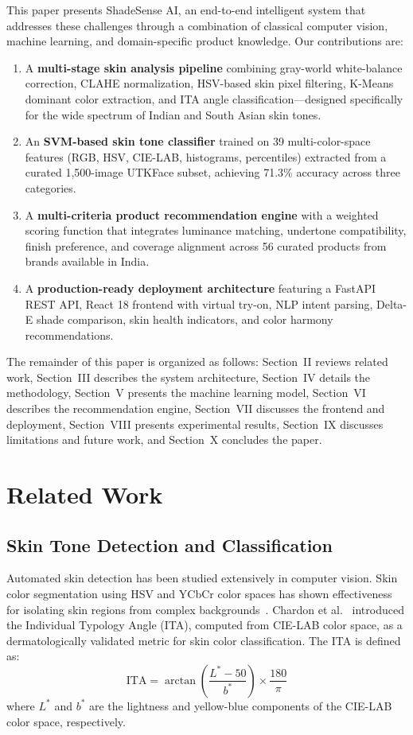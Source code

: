 \documentclass[conference]{IEEEtran}
\begin{document}
This paper presents ShadeSense AI, an end-to-end intelligent system that addresses these challenges through a combination of classical computer vision, machine learning, and domain-specific product knowledge. Our contributions are:

\begin{enumerate}
    \item A \textbf{multi-stage skin analysis pipeline} combining gray-world white-balance correction, CLAHE normalization, HSV-based skin pixel filtering, K-Means dominant color extraction, and ITA angle classification---designed specifically for the wide spectrum of Indian and South Asian skin tones.
    \item An \textbf{SVM-based skin tone classifier} trained on 39 multi-color-space features (RGB, HSV, CIE-LAB, histograms, percentiles) extracted from a curated 1,500-image UTKFace subset, achieving 71.3\% accuracy across three categories.
    \item A \textbf{multi-criteria product recommendation engine} with a weighted scoring function that integrates luminance matching, undertone compatibility, finish preference, and coverage alignment across 56 curated products from brands available in India.
    \item A \textbf{production-ready deployment architecture} featuring a FastAPI REST API, React 18 frontend with virtual try-on, NLP intent parsing, Delta-E shade comparison, skin health indicators, and color harmony recommendations.
\end{enumerate}

The remainder of this paper is organized as follows: Section~II reviews related work, Section~III describes the system architecture, Section~IV details the methodology, Section~V presents the machine learning model, Section~VI describes the recommendation engine, Section~VII discusses the frontend and deployment, Section~VIII presents experimental results, Section~IX discusses limitations and future work, and Section~X concludes the paper.

\section{Related Work}

\subsection{Skin Tone Detection and Classification}

Automated skin detection has been studied extensively in computer vision. Skin color segmentation using HSV and YCbCr color spaces has shown effectiveness for isolating skin regions from complex backgrounds~\cite{kakumanu2007}. Chardon et al.~\cite{chardon1991} introduced the Individual Typology Angle (ITA), computed from CIE-LAB color space, as a dermatologically validated metric for skin color classification. The ITA is defined as:
\begin{equation}
\text{ITA} = \arctan\left(\frac{L^* - 50}{b^*}\right) \times \frac{180}{\pi}
\label{eq:ita}
\end{equation}
where $L^*$ and $b^*$ are the lightness and yellow-blue components of the CIE-LAB color space, respectively.
\end{document}
